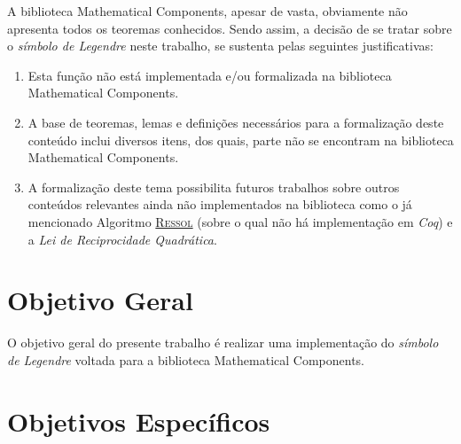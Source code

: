 A biblioteca Mathematical Components, apesar de vasta, obviamente não apresenta todos os teoremas conhecidos. Sendo assim, a decisão de se tratar sobre o \textit{símbolo de Legendre} neste trabalho, se sustenta pelas seguintes justificativas:
\begin{enumerate}
    \item Esta função não está implementada e/ou formalizada na biblioteca Mathematical Components.
    \item A base de teoremas, lemas e definições necessários para a formalização deste conteúdo inclui diversos itens, dos quais, parte não se encontram na biblioteca Mathematical Components.
    \item A formalização deste tema possibilita futuros trabalhos sobre outros conteúdos relevantes ainda não implementados na biblioteca como o já mencionado Algoritmo \hyperref[algo:ressol]{\textsc{Ressol}} (sobre o qual não há implementação em \textit{Coq}) e a \textit{Lei de Reciprocidade Quadrática}. 
    
\end{enumerate}

\section{Objetivo Geral}

O objetivo geral do presente trabalho é realizar uma implementação do \textit{símbolo de Legendre} voltada para a biblioteca Mathematical Components.

\section{Objetivos Específicos} \label{sec:obj-esp}

